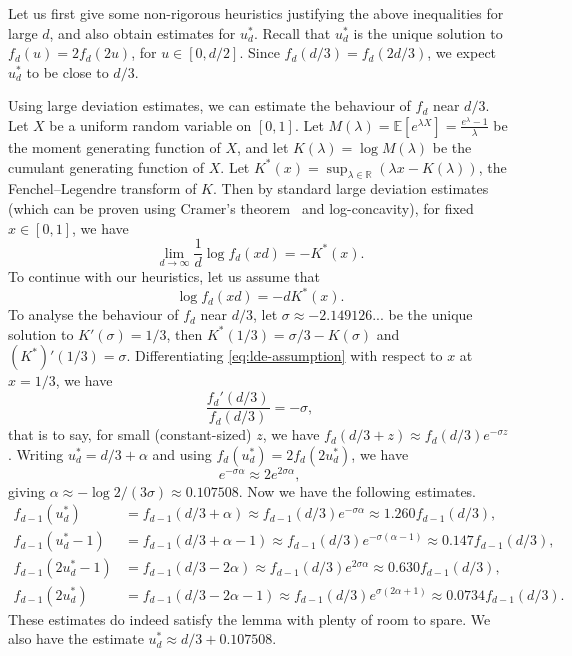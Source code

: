 \documentclass{article}
\newcommand{\EE}{\mathbb{E}}
\newcommand{\RR}{\mathbb{R}}
\theoremstyle{definition}
\begin{document}
Let us first give some non-rigorous heuristics justifying the above inequalities for large $d$, and also obtain estimates for $u_d^*$. Recall that $u_d^*$ is the unique solution to $f_d(u)=2f_d(2u)$, for $u\in [0,d/2]$. Since $f_d(d/3) = f_d(2d/3)$, we expect $u_d^*$ to be close to $d/3$. 

Using large deviation estimates, we can estimate the behaviour of $f_d$ near $d/3$. Let $X$ be a uniform random variable on $[0,1]$. Let $M(\lambda)=\EE[e^{\lambda X}]=\frac{e^\lambda-1}{\lambda}$ be the moment generating function of $X$, and let $K(\lambda)=\log M(\lambda)$ be the cumulant generating function of $X$. Let $K^*(x)=\sup_{\lambda\in \RR}(\lambda x - K(\lambda))$, the Fenchel--Legendre transform of $K$. Then by standard large deviation estimates (which can be proven using Cramer's theorem~\cite[Theorem~2.2.3]{DZ09} and log-concavity), for fixed $x\in [0,1]$, we have
\[\lim_{d\to \infty} \frac{1}{d}\log f_d(xd) = -K^*(x).\]
To continue with our heuristics, let us assume that 
\begin{equation} \label{eq:lde-assumption}
    \log f_d(xd)=-dK^*(x).
\end{equation}
To analyse the behaviour of $f_d$ near $d/3$, let $\sigma\approx -2.149126...$ be the unique solution to $K'(\sigma)=1/3$, then $K^*(1/3) = \sigma/3 - K(\sigma)$ and $(K^*)'(1/3)=\sigma$. Differentiating \eqref{eq:lde-assumption} with respect to $x$ at $x=1/3$, we have
\[\frac{f_d'(d/3)}{f_d(d/3)} = -\sigma,\]
that is to say, for small (constant-sized) $z$, we have $f_d(d/3+z) \approx f_d(d/3)e^{-\sigma z}$. Writing $u_d^* = d/3+\alpha$ and using $f_d(u_d^*)=2f_d(2u_d^*)$, we have
\[e^{-\sigma \alpha}\approx 2e^{2\sigma \alpha},\]
giving $\alpha\approx -\log 2/(3\sigma)\approx 0.107508$. Now we have the following estimates.
\begin{align*}
    f_{d-1}(u_d^*) &= f_{d-1}(d/3+\alpha) \approx f_{d-1}(d/3)e^{-\sigma \alpha}\approx 1.260 f_{d-1}(d/3), \\
    f_{d-1}(u_d^*-1) &= f_{d-1}(d/3+\alpha-1) \approx f_{d-1}(d/3)e^{-\sigma(\alpha-1)}\approx 0.147 f_{d-1}(d/3), \\
    f_{d-1}(2u_d^*-1) &= f_{d-1}(d/3-2\alpha) \approx f_{d-1}(d/3)e^{2\sigma \alpha}\approx 0.630 f_{d-1}(d/3), \\
    f_{d-1}(2u_d^*) &= f_{d-1}(d/3-2\alpha-1) \approx f_{d-1}(d/3)e^{\sigma (2\alpha+1)}\approx 0.0734 f_{d-1}(d/3).
\end{align*}
These estimates do indeed satisfy the lemma with plenty of room to spare. We also have the estimate $u_d^* \approx d/3 + 0.107508$.
\end{document}
